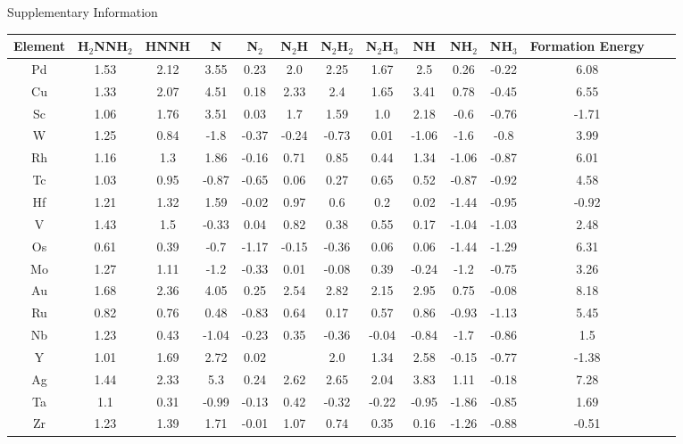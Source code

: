 Supplementary Information
\onecolumn
\begin{table}
\begin{center}
\begin{tabular}{| c | c | c | c | c | c | c | c | c | c | c | c | c | c |}
\hline
Element & H$_2$NNH$_2$ & HNNH & N & N$_2$ & N$_2$H & N$_2$H$_2$ & N$_2$H$_3$ & NH & NH$_2$ & NH$_3$ & Formation Energy\\
\hline

Pd & 1.53 & 2.12 & 3.55 & 0.23 & 2.0 & 2.25 & 1.67 & 2.5 & 0.26 & -0.22 & 6.08 \\
Cu & 1.33 & 2.07 & 4.51 & 0.18 & 2.33 & 2.4 & 1.65 & 3.41 & 0.78 & -0.45 & 6.55 \\
Sc & 1.06 & 1.76 & 3.51 & 0.03 & 1.7 & 1.59 & 1.0 & 2.18 & -0.6 & -0.76 & -1.71 \\
W & 1.25 & 0.84 & -1.8 & -0.37 & -0.24 & -0.73 & 0.01 & -1.06 & -1.6 & -0.8 & 3.99 \\
Rh & 1.16 & 1.3 & 1.86 & -0.16 & 0.71 & 0.85 & 0.44 & 1.34 & -1.06 & -0.87 & 6.01 \\
Tc & 1.03 & 0.95 & -0.87 & -0.65 & 0.06 & 0.27 & 0.65 & 0.52 & -0.87 & -0.92 & 4.58 \\
Hf & 1.21 & 1.32 & 1.59 & -0.02 & 0.97 & 0.6 & 0.2 & 0.02 & -1.44 & -0.95 & -0.92 \\
V & 1.43 & 1.5 & -0.33 & 0.04 & 0.82 & 0.38 & 0.55 & 0.17 & -1.04 & -1.03 & 2.48 \\
Os & 0.61 & 0.39 & -0.7 & -1.17 & -0.15 & -0.36 & 0.06 & 0.06 & -1.44 & -1.29 & 6.31 \\
Mo & 1.27 & 1.11 & -1.2 & -0.33 & 0.01 & -0.08 & 0.39 & -0.24 & -1.2 & -0.75 & 3.26 \\
Au & 1.68 & 2.36 & 4.05 & 0.25 & 2.54 & 2.82 & 2.15 & 2.95 & 0.75 & -0.08 & 8.18 \\
Ru & 0.82 & 0.76 & 0.48 & -0.83 & 0.64 & 0.17 & 0.57 & 0.86 & -0.93 & -1.13 & 5.45 \\
Nb & 1.23 & 0.43 & -1.04 & -0.23 & 0.35 & -0.36 & -0.04 & -0.84 & -1.7 & -0.86 & 1.5 \\
Y & 1.01 & 1.69 & 2.72 & 0.02 &  & 2.0 & 1.34 & 2.58 & -0.15 & -0.77 & -1.38 \\
Ag & 1.44 & 2.33 & 5.3 & 0.24 & 2.62 & 2.65 & 2.04 & 3.83 & 1.11 & -0.18 & 7.28 \\
Ta & 1.1 & 0.31 & -0.99 & -0.13 & 0.42 & -0.32 & -0.22 & -0.95 & -1.86 & -0.85 & 1.69 \\
Zr & 1.23 & 1.39 & 1.71 & -0.01 & 1.07 & 0.74 & 0.35 & 0.16 & -1.26 & -0.88 & -0.51 \\

\end{tabular}
\end{center}
\end{table}
